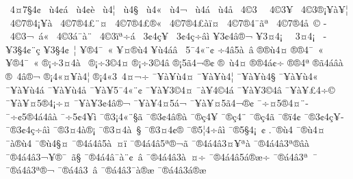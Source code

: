 {^^ad^^a04^^a47^^a74^^a2
^^ad^^a0^^f94^^a2^^e1
^^ad^^a0^^f94^^a2^^e8
^^ad^^a0^^f94^^a6
^^ad^^a0^^f94^^a7
^^ad^^a0^^f94^^ab
^^ad^^a0^^f94^^ac
^^ad^^a0^^f94^^e1
^^ad^^a0^^f94^^e5
^^ad^^a04^^a93^^a0
^^ad^^a04^^a93^^a5
^^ad^^a04^^a93^^ae^^a1^^a5^^e0^^a5^^a6
^^ad^^a04^^a97^^ae4^^a1^^a5^^e0
^^ad^^a04^^a97^^ae4^^a3^^a8^^a4
^^ad^^a04^^a97^^ae4^^a3^^ae^^ab
^^ad^^a04^^a97^^ae4^^a3^^e0^^ef^^a4
^^ad^^a04^^a97^^ae4^^af^^e3^^aa
^^ad^^a04^^a97^^ae4^^e5^^a0^^a9
^^ad^^a04^^a93^^ac^^a0^^e1^^ab
^^ad^^a04^^a93^^e1^^af^^e0^^a8
^^ad^^a04^^a93^^ef^^aa^^f7^^e1
^^ad^^a03^^a24^^e7^^a5^^ad
^^ad^^a03^^a24^^e7^^f7^^e2^^ec
^^ad^^a53^^a24^^e2^^ae^^ac
^^ad^^a53^^a44^^a1^^a0^^ad
^^ad^^a03^^a44^^a1^^a0^^ad
^^ad^^a53^^a74^^a2^^a8^^e7
^^ad^^a53^^a74^^a2^^a0^^a6
^^ad^^a5^^ae4^^af^^a0^^ab
^^ad^^a5^^a4^^ae^^f94
^^ad^^a5^^f94^^e1^^e2
^^ad^^a05^^af4^^ab^^a8^^a2
^^ad^^f74^^e25^^e0^^a0^^e2
^^ae^^ad^^ae^^f94^^a4
^^ae^^ae4^^af^^a0^^ab
^^a5^^ae4^^af^^a0^^ab
^^ae^^a1^^f73^^a44^^e0^^a0^^ad
^^ae^^a1^^f73^^a94^^a4
^^ae^^a1^^f73^^a94^^e2
^^ae^^a15^^e34^^ac^^ae^^a2
^^ae^^ad^^a0^^f94^^a4
^^ae^^ae4^^e1^^a2^^f7
^^ae^^ae4^^aa
^^ae^^e34^^e1^^e2^^e0 
^^ae^^a04^^e2^^ae^^ac
^^ae^^a14^^ab^^a4^^a5^^e04^^a6
^^ae^^a14^^ab3^^a04^^a4^^ac^^f7^^ad
^^af^^a5^^e0^^a5^^f94^^a4
^^af^^a5^^e0^^a5^^f94^^a6
^^af^^a5^^e0^^a5^^f94^^a7
^^af^^a5^^e0^^a5^^f94^^ab
^^af^^a5^^e0^^a5^^f94^^e1
^^af^^a5^^e0^^a5^^f94^^e5
^^af^^a5^^e0^^a55^^af4^^ab^^a8^^a2
^^af^^a5^^e0^^a53^^a94^^a4
^^af^^e0^^a54^^a94^^e1
^^af^^a5^^e0^^a53^^a94^^e2
^^af^^a5^^e0^^a5^^a34^^ad^^f7^^a9
^^af^^a5^^e0^^a5^^a45^^ae4^^a1^^f7^^a4
^^af^^a5^^e0^^a53^^a24^^e2^^ae^^ac
^^af^^a5^^e0^^a54^^a45^^e1^^ac
^^af^^a5^^e0^^a5^^a45^^e34^^ac^^ae^^a2
^^af^^f7^^a45^^ae4^^a4^^a8^^ad
^^af^^f7^^a25^^ae4^^e14^^e2^^e0
^^af^^f75^^a24^^a5^^ad^^ec
^^af^^ae3^^a14^^ab^^a8^^a7^^e3
^^af^^ae3^^a24^^e2^^ae^^e0
^^af^^ae^^e74^^ad^^a5
^^af^^ae^^e74^^ad^^a8
^^af^^ae^^e74^^ad^^e3
^^af^^ae^^ef4^^a2
^^af^^ae3^^a24^^e7^^a5^^ad
^^af^^ae3^^a24^^e7^^f7^^e2^^ec
^^af^^ae3^^a44^^e0^^ae^^a1
^^af^^ae3^^a44^^e0^^a0^^a7
^^af^^ae3^^a44^^a2^^ae
^^af^^ae5^^a64^^ad^^f7^^e2^^ec
^^af^^ae5^^a74^^a1^^a0^^a2
.^^af^^ae^^f94
^^af^^ae^^f94^^a4
^^af^^e0^^ae^^f94
^^af^^ae^^f94^^a7^^a4
^^af^^ae4^^e14^^e25^^e0^^a0^^a4^^ef^^ad
^^af^^ae4^^e14^^e25^^aa^^ae^^ac^^e3
^^af^^ae4^^e14^^e23^^a4^^a5^^aa^^e0
^^af^^ae4^^e14^^e23^^aa^^ae^^ad^^e2^^e0^^a0
^^af^^ae4^^e14^^e23^^ac^^a5^^ad^^ae^^af^^a0^^e3^^a7
^^af^^ae4^^e14^^e2^^af^^e0^^a8^^a2^^a0^^e2
^^af^^ae4^^e14^^e23^^e0^^a0^^a4^^f7
^^af^^ae4^^e14^^e25^^e1^^ae^^e6^^f7
^^af^^ae^^e14^^e23^^aa^^a0^^af
^^af^^ae^^e14^^e23^^aa^^ae^^ac
^^af^^ae^^e14^^e23^^ad^^a0^^e2
^^af^^ae^^e14^^e23^^af^^e0^^ae^^e6
^^af^^ae^^e14^^e23^^e1^^ae^^e6
}
